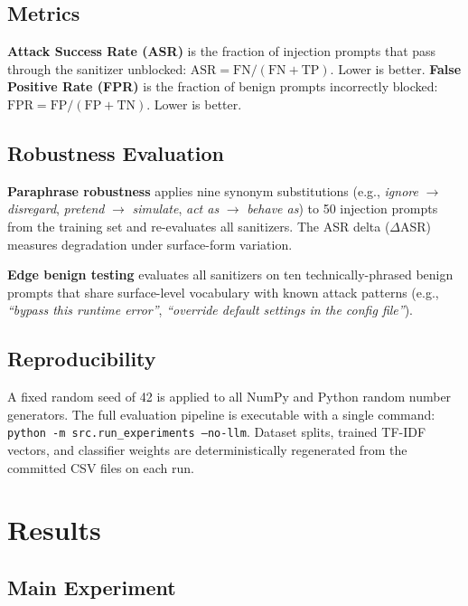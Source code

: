 \documentclass[10pt,conference]{IEEEtran}
\begin{document}
\subsection{Metrics}

\textbf{Attack Success Rate (ASR)} is the fraction of injection
prompts that pass through the sanitizer unblocked:
$\text{ASR} = \text{FN} / (\text{FN} + \text{TP})$.
Lower is better.
\textbf{False Positive Rate (FPR)} is the fraction of benign prompts
incorrectly blocked:
$\text{FPR} = \text{FP} / (\text{FP} + \text{TN})$.
Lower is better.

\subsection{Robustness Evaluation}

\textbf{Paraphrase robustness} applies nine synonym substitutions
(e.g., \textit{ignore} $\rightarrow$ \textit{disregard},
\textit{pretend} $\rightarrow$ \textit{simulate},
\textit{act as} $\rightarrow$ \textit{behave as})
to 50 injection prompts from the training set and re-evaluates all
sanitizers.
The ASR delta ($\Delta$ASR) measures degradation under surface-form
variation.

\textbf{Edge benign testing} evaluates all sanitizers on ten
technically-phrased benign prompts that share surface-level
vocabulary with known attack patterns
(e.g., \textit{``bypass this runtime error''},
\textit{``override default settings in the config file''}).

\subsection{Reproducibility}

A fixed random seed of 42 is applied to all NumPy and Python random
number generators.
The full evaluation pipeline is executable with a single command:
\texttt{python -m src.run\_experiments --no-llm}.
Dataset splits, trained TF-IDF vectors, and classifier weights are
deterministically regenerated from the committed CSV files on each
run.

\section{Results}
\label{sec:results}

\subsection{Main Experiment}
\end{document}
